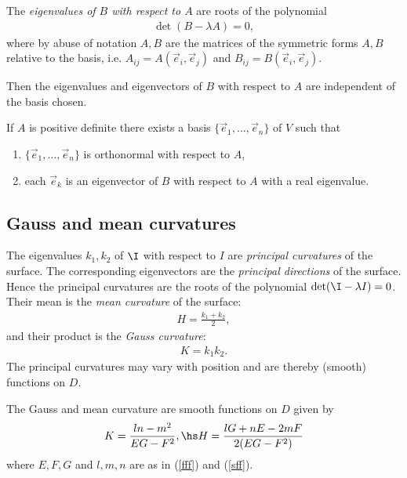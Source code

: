 \documentclass{article}
\begin{document}
\begin{definition}
	The \emph{eigenvalues of $B$ with respect to $A$} are roots of the polynomial
	\begin{align*}
		\det(B-\lambda A) = 0,
	\end{align*}
	where by abuse of notation $A,B$ are the matrices of the symmetric forms $A,B$ relative to the
	basis, i.e. $A_{ij}=A(\vec e_i,\vec e_j)$ and $B_{ij}=B(\vec e_i,\vec e_j)$.
\end{definition}

\begin{lemma}[Notes 8.1]
	Then the eigenvalues and eigenvectors of $B$ with respect
	to $A$ are independent of the basis chosen.
\end{lemma}

\begin{proposition}[Notes 8.3]
	If $A$ is positive definite there exists a basis $\{\vec e_1, ..., \vec e_n\}$ of $V$ such that
	\begin{enumerate}
		\item $\{\vec e_1,...,\vec e_n\}$ is orthonormal with respect to $A$,
		\item each $\vec e_k$ is an eigenvector of $B$ with respect to $A$ with a real eigenvalue.
	\end{enumerate}
\end{proposition}

\subsection{Gauss and mean curvatures}

\begin{definition}
	The eigenvalues $k_1,k_2$ of $\I$ with respect to $I$ are \emph{principal curvatures} of the surface.
	The corresponding eigenvectors are the \emph{principal directions} of the surface. Hence the
	principal curvatures are the roots of the polynomial $\det(\I-\lambda I)=0$. Their mean is the
	\emph{mean curvature} of the surface:
	\begin{align*}
		H=\frac{k_1+k_2}{2},
	\end{align*}
	and their product is the \emph{Gauss curvature}:
	\begin{align*}
		K = k_1k_2.
	\end{align*}
	The principal curvatures may vary with position and are thereby (smooth) functions on $D$.
\end{definition}

\begin{proposition}[Notes 8.5]
	The Gauss and mean curvature are smooth functions on $D$ given by
	\begin{align*}
		K=\frac{ln-m^2}{EG-F^2},\hs
		H=\frac{lG+nE-2mF}{2(EG-F^2)}
	\end{align*}
	where $E,F,G$ and $l,m,n$ are as in (\ref{fff}) and (\ref{sff}).
\end{proposition}
\end{document}
